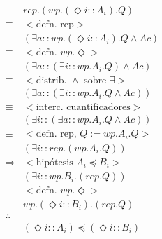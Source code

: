 \documentclass{article}
\begin{document}
\begin{align*}
 & rep.(wp.(\Diamond i :: A_i).Q) \\
 \equiv & <\text{defn. rep}> \\
 & (\exists a :: wp.(\Diamond i :: A_i).Q \wedge Ac) \\
 \equiv & <\text{defn. } wp.\Diamond> \\
 & (\exists a :: (\exists i :: wp.A_i.Q) \wedge Ac) \\
 \equiv & <\text{distrib. } \wedge \text{ sobre } \exists> \\
 & (\exists a :: (\exists i :: wp.A_i.Q \wedge Ac)) \\
 \equiv & <\text{interc. cuantificadores}> \\
 & (\exists i :: (\exists a :: wp.A_i.Q \wedge Ac)) \\
 \equiv & <\text{defn. rep, } Q := wp.A_i.Q> \\
 & (\exists i :: rep.(wp.A_i.Q)) \\
 \Rightarrow & <\text{hipótesis } A_i \preccurlyeq B_i> \\
 & (\exists i :: wp.B_i.(rep.Q)) \\
 \equiv & <\text{defn. } wp.\Diamond> \\
 & wp.(\Diamond i :: B_i).(rep.Q) \\
 \therefore & \\
 & (\Diamond i :: A_i) \preccurlyeq (\Diamond i :: B_i) \\
\end{align*}
\end{document}
